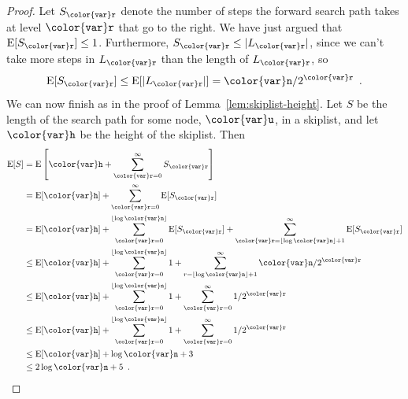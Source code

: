 \documentclass[10pt]{book}
\theoremstyle{plain}
\newcommand{\lemref}[1]{Lemma~\ref{lem:#1}}
\theoremstyle{definition}
\newcommand{\E}{\mathrm{E}}
\begin{document}
\begin{proof}
  Let $S_{\ensuremath{\mathtt{{\color{var}r}}}}$ denote the number of steps the forward search path takes at level
  $\ensuremath{\mathtt{{\color{var}r}}}$ that go to the right.   We have just argued that $\E[S_{\ensuremath{\mathtt{{\color{var}r}}}}]\le
  1$.  Furthermore, $S_{\ensuremath{\mathtt{{\color{var}r}}}}\le |L_{\ensuremath{\mathtt{{\color{var}r}}}}|$, since we can't take more steps
  in $L_{\ensuremath{\mathtt{{\color{var}r}}}}$ than the length of $L_{\ensuremath{\mathtt{{\color{var}r}}}}$, so
  \[
    \E[S_{\ensuremath{\mathtt{{\color{var}r}}}}] \le \E[|L_{\ensuremath{\mathtt{{\color{var}r}}}}|] = \ensuremath{\mathtt{{\color{var}n}}}/2^{\ensuremath{\mathtt{{\color{var}r}}}} \enspace .
  \]
  We can now finish as in the proof of \lemref{skiplist-height}.
  Let $S$ be  the length of the search path for some node, \ensuremath{\mathtt{{\color{var}u}}}, in a
  skiplist, and let $\ensuremath{\mathtt{{\color{var}h}}}$ be the height of the skiplist.  Then
  \begin{align*}
      \E[S] 
         &= \E\left[ \ensuremath{\mathtt{{\color{var}h}}} + \sum_{\ensuremath{\mathtt{{\color{var}r}}}=0}^\infty S_{\ensuremath{\mathtt{{\color{var}r}}}} \right] \\
         &= \E[\ensuremath{\mathtt{{\color{var}h}}}] + \sum_{\ensuremath{\mathtt{{\color{var}r}}}=0}^\infty \E[S_{\ensuremath{\mathtt{{\color{var}r}}}}]  \\
         &= \E[\ensuremath{\mathtt{{\color{var}h}}}] + \sum_{\ensuremath{\mathtt{{\color{var}r}}}=0}^{\lfloor\log \ensuremath{\mathtt{{\color{var}n}}}\rfloor} \E[S_{\ensuremath{\mathtt{{\color{var}r}}}}] 
              + \sum_{\ensuremath{\mathtt{{\color{var}r}}}=\lfloor\log \ensuremath{\mathtt{{\color{var}n}}}\rfloor+1}^\infty \E[S_{\ensuremath{\mathtt{{\color{var}r}}}}] \\
         &\le \E[\ensuremath{\mathtt{{\color{var}h}}}] + \sum_{\ensuremath{\mathtt{{\color{var}r}}}=0}^{\lfloor\log \ensuremath{\mathtt{{\color{var}n}}}\rfloor} 1
              + \sum_{r=\lfloor\log \ensuremath{\mathtt{{\color{var}n}}}\rfloor+1}^\infty \ensuremath{\mathtt{{\color{var}n}}}/2^{\ensuremath{\mathtt{{\color{var}r}}}} \\
         &\le \E[\ensuremath{\mathtt{{\color{var}h}}}] + \sum_{\ensuremath{\mathtt{{\color{var}r}}}=0}^{\lfloor\log \ensuremath{\mathtt{{\color{var}n}}}\rfloor} 1
              + \sum_{\ensuremath{\mathtt{{\color{var}r}}}=0}^{\infty} 1/2^{\ensuremath{\mathtt{{\color{var}r}}}} \\
         &\le \E[\ensuremath{\mathtt{{\color{var}h}}}] + \sum_{\ensuremath{\mathtt{{\color{var}r}}}=0}^{\lfloor\log \ensuremath{\mathtt{{\color{var}n}}}\rfloor} 1
              + \sum_{\ensuremath{\mathtt{{\color{var}r}}}=0}^{\infty} 1/2^{\ensuremath{\mathtt{{\color{var}r}}}} \\
         &\le \E[\ensuremath{\mathtt{{\color{var}h}}}] + \log \ensuremath{\mathtt{{\color{var}n}}} + 3 \\
         &\le 2\log \ensuremath{\mathtt{{\color{var}n}}} + 5  \enspace . \qedhere
  \end{align*}
\end{proof}
\end{document}
